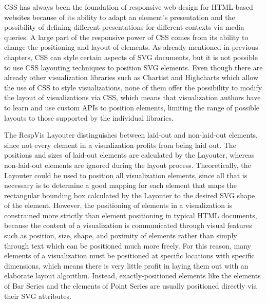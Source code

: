 CSS has always been the foundation of responsive web design for
HTML-based websites because of its ability to adapt an element's
presentation and the possibility of defining different presentations
for different contexts via media queries. A large part of the
responsive power of CSS comes from its ability to change the
positioning and layout of elements. As already mentioned in previous
chapters, CSS can style certain aspects of SVG documents, but it is
not possible to use CSS layouting techniques to position SVG elements.
Even though there are already other visualization libraries such as
Chartist \parencite{Chartist} and Highcharts \parencite{Highcharts}
which allow the use of CSS to style visualizations, none of them offer
the possibility to modify the layout of visualizations via CSS, which
means that visualization authors have to learn and use custom APIs to
position elements, limiting the range of possible layouts to those
supported by the individual libraries.

The RespVis Layouter distinguishes between laid-out and non-laid-out
elements, since not every element in a visualization profits from
being laid out. The positions and sizes of laid-out elements are
calculated by the Layouter, whereas non-laid-out elements are ignored
during the layout process. Theoretically, the Layouter could be used
to position all visualization elements, since all that is necessary is
to determine a good mapping for each element that maps the rectangular
bounding box calculated by the Layouter to the desired SVG shape of
the element. However, the positioning of elements in a visualization
is constrained more strictly than element positioning in typical HTML
documents, because the content of a visualization is communicated
through visual features such as position, size, shape, and poximity of
elements rather than simply through text which can be positioned much
more freely. For this reason, many elements of a visualization must be
positioned at specific locations with specific dimensions, which means
there is very little profit in laying them out with an elaborate
layout algorithm. Instead, exactly-positioned elements like the
 elements of Bar Series and the  elements
of Point Series are usually positioned directly via their SVG
attributes.


